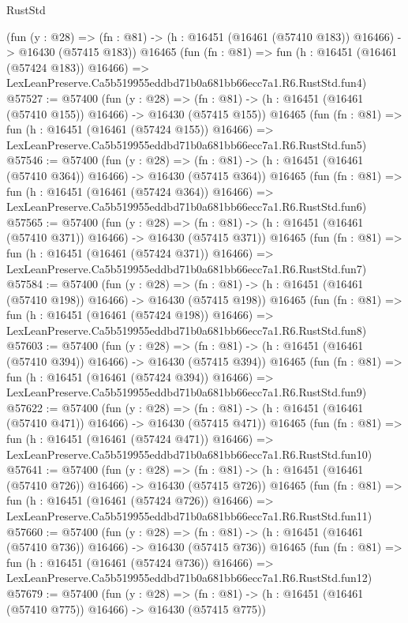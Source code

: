 \begin{lexlean}{RustStd}
\begin{coremodule}
    (fun (y : @28) =>
    (fn : @81) -> (h : @16451 (@16461 (@57410 @183)) @16466) -> @16430 (@57415 @183))
    @16465
    (fun (fn : @81) =>
    fun (h : @16451 (@16461 (@57424 @183)) @16466) =>
    LexLeanPreserve.Ca5b519955eddbd71b0a681bb66ecc7a1.R6.RustStd.fun4)
@57527 := @57400
    (fun (y : @28) =>
    (fn : @81) -> (h : @16451 (@16461 (@57410 @155)) @16466) -> @16430 (@57415 @155))
    @16465
    (fun (fn : @81) =>
    fun (h : @16451 (@16461 (@57424 @155)) @16466) =>
    LexLeanPreserve.Ca5b519955eddbd71b0a681bb66ecc7a1.R6.RustStd.fun5)
@57546 := @57400
    (fun (y : @28) =>
    (fn : @81) -> (h : @16451 (@16461 (@57410 @364)) @16466) -> @16430 (@57415 @364))
    @16465
    (fun (fn : @81) =>
    fun (h : @16451 (@16461 (@57424 @364)) @16466) =>
    LexLeanPreserve.Ca5b519955eddbd71b0a681bb66ecc7a1.R6.RustStd.fun6)
@57565 := @57400
    (fun (y : @28) =>
    (fn : @81) -> (h : @16451 (@16461 (@57410 @371)) @16466) -> @16430 (@57415 @371))
    @16465
    (fun (fn : @81) =>
    fun (h : @16451 (@16461 (@57424 @371)) @16466) =>
    LexLeanPreserve.Ca5b519955eddbd71b0a681bb66ecc7a1.R6.RustStd.fun7)
@57584 := @57400
    (fun (y : @28) =>
    (fn : @81) -> (h : @16451 (@16461 (@57410 @198)) @16466) -> @16430 (@57415 @198))
    @16465
    (fun (fn : @81) =>
    fun (h : @16451 (@16461 (@57424 @198)) @16466) =>
    LexLeanPreserve.Ca5b519955eddbd71b0a681bb66ecc7a1.R6.RustStd.fun8)
@57603 := @57400
    (fun (y : @28) =>
    (fn : @81) -> (h : @16451 (@16461 (@57410 @394)) @16466) -> @16430 (@57415 @394))
    @16465
    (fun (fn : @81) =>
    fun (h : @16451 (@16461 (@57424 @394)) @16466) =>
    LexLeanPreserve.Ca5b519955eddbd71b0a681bb66ecc7a1.R6.RustStd.fun9)
@57622 := @57400
    (fun (y : @28) =>
    (fn : @81) -> (h : @16451 (@16461 (@57410 @471)) @16466) -> @16430 (@57415 @471))
    @16465
    (fun (fn : @81) =>
    fun (h : @16451 (@16461 (@57424 @471)) @16466) =>
    LexLeanPreserve.Ca5b519955eddbd71b0a681bb66ecc7a1.R6.RustStd.fun10)
@57641 := @57400
    (fun (y : @28) =>
    (fn : @81) -> (h : @16451 (@16461 (@57410 @726)) @16466) -> @16430 (@57415 @726))
    @16465
    (fun (fn : @81) =>
    fun (h : @16451 (@16461 (@57424 @726)) @16466) =>
    LexLeanPreserve.Ca5b519955eddbd71b0a681bb66ecc7a1.R6.RustStd.fun11)
@57660 := @57400
    (fun (y : @28) =>
    (fn : @81) -> (h : @16451 (@16461 (@57410 @736)) @16466) -> @16430 (@57415 @736))
    @16465
    (fun (fn : @81) =>
    fun (h : @16451 (@16461 (@57424 @736)) @16466) =>
    LexLeanPreserve.Ca5b519955eddbd71b0a681bb66ecc7a1.R6.RustStd.fun12)
@57679 := @57400
    (fun (y : @28) =>
    (fn : @81) -> (h : @16451 (@16461 (@57410 @775)) @16466) -> @16430 (@57415 @775))

\end{coremodule}
\end{lexlean}
